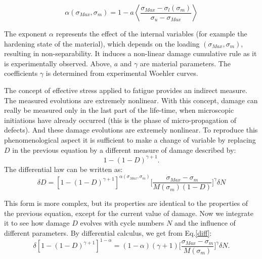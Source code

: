 \vspace{6pt}
$$\alpha(\sigma_{Max},\sigma_m)=1-a\left\langle\dfrac{\sigma_{Max}-\sigma_l(\sigma_m)}{\sigma_u-\sigma_{Max}}\right\rangle$$
\vspace{6pt}

The exponent $\alpha$ represents the effect of the internal variables (for example the hardening state of the material), which depends on the loading $(\sigma_{Max},\sigma_m)$, resulting in non-separability. It induces a non-linear damage cumulative rule as it is experimentally observed. Above, $a$ and $\gamma$ are material parameters. The coefficients $\gamma$ is determined from experimental Woehler curves. 

The concept of effective stress applied to fatigue provides an indirect measure. The measured evolutions are extremely nonlinear. With this concept, damage can really be measured only in the last part of the life-time, when microscopic initiations have already occurred (this is the phase of micro-propagation of defects). And these damage evolutions are extremely nonlinear. To reproduce this phenomenological aspect it is sufficient to make a change of variable by replacing $D$ in the previous equation by a different measure of damage described by:
$$1-(1-D)^{\gamma+1}.$$
The differential law can be written as:
\begin{equation}\delta D=[1-(1-D)^{\gamma+1}]^{\alpha(\sigma_{Max},\sigma_m)}\big[\frac{\sigma_{Max}-\sigma_m}{M(\sigma_m)(1-D)}\big]^\gamma\delta N
\label{diff}
\end{equation}

This form is more complex, but its properties are identical to the properties of the previous equation, except for the current value of damage. Now we integrate it to see how damage $D$ evolves with cycle numbers $N$ and the influence of different parameters. By differential calculus, we get from Eq.\eqref{diff}:
\begin{equation}\delta [1-(1-D)^{\gamma+1}]^{1-\alpha}=(1-\alpha)(\gamma+1)\big[\frac{\sigma_{Max}-\sigma_m}{M(\sigma_m)}\big]^\gamma\delta N.
\label{easyintegration}
\end{equation}


